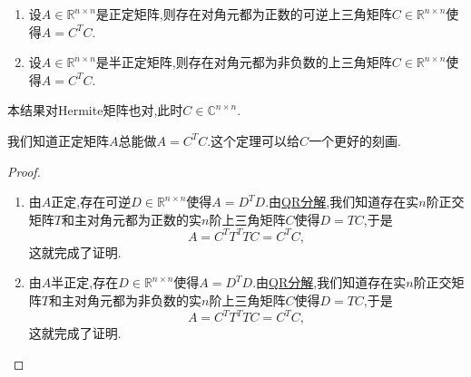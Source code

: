 \documentclass[../../main.tex]{subfiles}%
\begin{document}
\begin{theorem}[(半)正定矩阵的Chelesky分解]\label{theorem:(半)正定矩阵的Chelesky分解}
\begin{enumerate}
\item 设\( A \in \mathbb{R}^{n \times n} \)是正定矩阵,则存在对角元都为正数的可逆上三角矩阵\( C \in \mathbb{R}^{n \times n} \)使得\( A = C^T C \).

\item 设\( A \in \mathbb{R}^{n \times n} \)是半正定矩阵,则存在对角元都为非负数的上三角矩阵\( C \in \mathbb{R}^{n \times n} \)使得\( A = C^T C \).
\end{enumerate}
\end{theorem}
\begin{note}
本结果对Hermite矩阵也对,此时\( C \in \mathbb{C}^{n \times n} \).

我们知道正定矩阵\( A \)总能做\( A = C^T C \).这个定理可以给\( C \)一个更好的刻画.
\end{note}
\begin{proof}
\begin{enumerate}
\item 由\( A \)正定,存在可逆\( D \in \mathbb{R}^{n \times n} \)使得\( A = D^T D \).由\hyperref[theorem:施密特正交化对应的矩阵分解,QR分解]{QR分解},我们知道存在实\( n \)阶正交矩阵\( T \)和主对角元都为正数的实\( n \)阶上三角矩阵\( C \)使得\( D = TC \),于是
\[
A = C^T T^T T C = C^T C,
\]
这就完成了证明.

\item 由\( A \)半正定,存在\( D \in \mathbb{R}^{n \times n} \)使得\( A = D^T D \).由\hyperref[theorem:施密特正交化对应的矩阵分解,QR分解]{QR分解},我们知道存在实\( n \)阶正交矩阵\( T \)和主对角元都为非负数的实\( n \)阶上三角矩阵\( C \)使得\( D = TC \),于是
\[
A = C^T T^T T C = C^T C,
\]
这就完成了证明.
\end{enumerate}

\end{proof}
\end{document}
